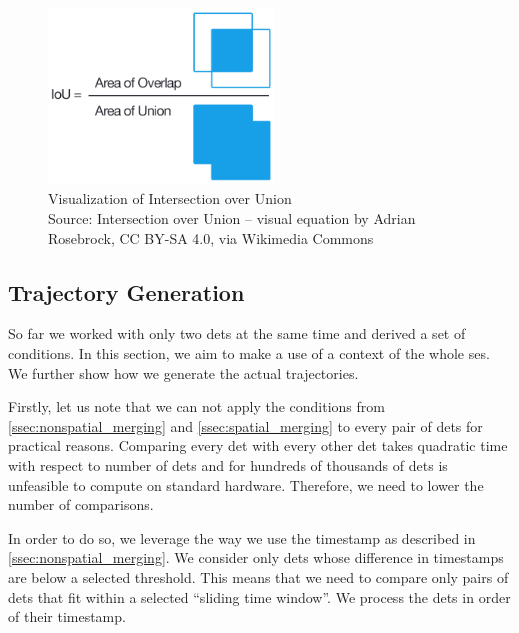 \begin{figure}
    \centering
    \includegraphics[width=6cm]{img/Intersection_over_Union_-_visual_equation.png}
    \caption[Visualization of Intersection over Union]{Visualization of Intersection over Union\\Source: Intersection over Union -- visual equation\protect\footnotemark{} by Adrian Rosebrock, CC BY-SA 4.0,\footnotemark{} via Wikimedia Commons}
    \label{fig:iou}
\end{figure}
\addtocounter{footnote}{-2}


\subsection{Trajectory Generation}

\label{ssec:trajectory_generation}

So far we worked with only two \glspl{det} at the same time and derived a set of conditions. In this section, we aim to make a use of a context of the whole \gls{ses}. We further show how we generate the actual trajectories.

Firstly, let us note that we can not apply the conditions from \autoref{ssec:nonspatial_merging} and \autoref{ssec:spatial_merging} to every pair of \glspl{det} for practical reasons. Comparing every \gls{det} with every other \gls{det} takes quadratic time with respect to number of \glspl{det} and for hundreds of thousands of \glspl{det} is unfeasible to compute on standard hardware. Therefore, we need to lower the number of comparisons.

In order to do so, we leverage the way we use the timestamp as described in \autoref{ssec:nonspatial_merging}. We consider only \glspl{det} whose difference in timestamps are below a selected threshold. This means that we need to compare only pairs of \glspl{det} that fit within a selected ``sliding time window''. We process the \glspl{det} in order of their timestamp.

